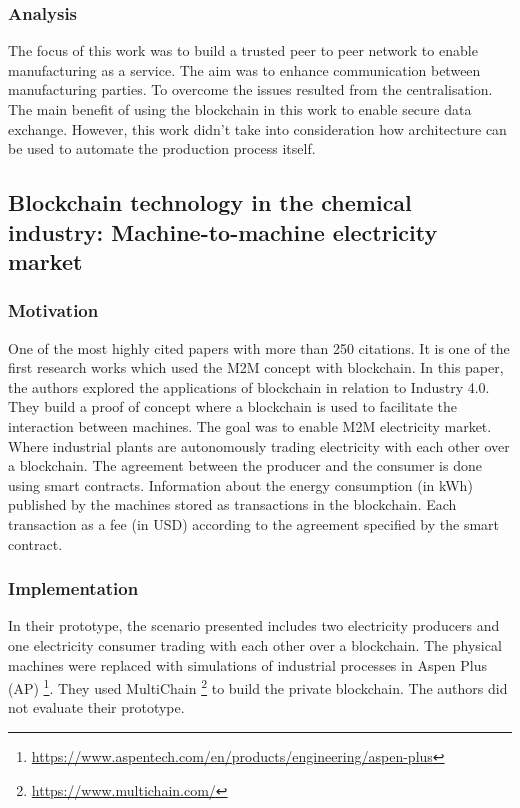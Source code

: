 \documentclass[runningheads]{llncs}
\begin{document}
\subsubsection{Analysis}
The focus of this work was to build a trusted peer to peer network to enable manufacturing as a service. The aim was to enhance communication between manufacturing parties. To overcome the issues resulted from the centralisation. The main benefit of using the blockchain in this work to enable secure data exchange. However, this work didn't take into consideration how architecture can be used to automate the production process itself.



\newpage
\subsection{Blockchain technology in the chemical industry: Machine-to-machine electricity market \cite{Sikorski2017}}
\subsubsection{Motivation}
One of the most highly cited papers with more than 250 citations. It is one of the first research works which used the M2M concept with blockchain. In this paper, the authors explored the applications of blockchain in relation to Industry 4.0. They build a proof of concept where a blockchain is used to facilitate the interaction between machines. The goal was to enable M2M electricity market. Where industrial plants are autonomously trading electricity with each other over a blockchain. The agreement between the producer and the consumer is done using smart contracts. Information about the energy consumption (in kWh) published by the machines stored as transactions in the blockchain. Each transaction as a fee (in USD) according to the agreement specified by the smart contract. 
\subsubsection{Implementation}
In their prototype, the scenario presented includes two electricity producers and one electricity consumer trading with each other over a blockchain. The physical machines were replaced with simulations of industrial processes in Aspen Plus (AP) \footnote{\url{https://www.aspentech.com/en/products/engineering/aspen-plus}}. They used MultiChain \footnote{\url{https://www.multichain.com/}} to build the private blockchain. The authors did not evaluate their prototype. 
\end{document}
